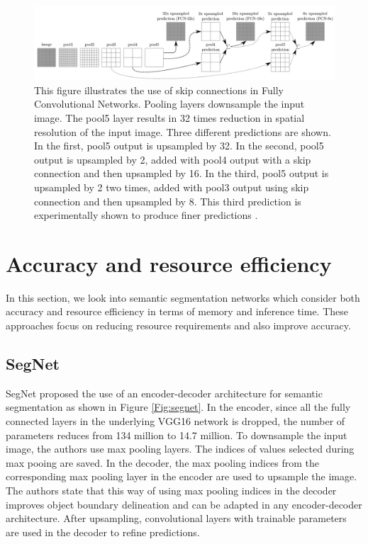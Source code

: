 	\begin{figure}[h]
		\centering
		\includegraphics[width=1\linewidth]{images/fcn_skip}
		\caption{This figure illustrates the use of skip connections in Fully Convolutional Networks. Pooling layers downsample the input image. The pool5 layer results in 32 times reduction in spatial resolution of the input image. Three different predictions are shown. In the first, pool5 output is upsampled by 32. In the second, pool5 output is upsampled by 2, added with pool4 output with a skip connection and then upsampled by 16. In the third, pool5 output is upsampled by 2 two times, added with pool3 output using skip connection and then upsampled by 8. This third prediction is experimentally shown to produce finer predictions \cite{DBLP:journals/corr/LongSD14}.}
		\label{Fig:fcn}
	\end{figure}

\section{Accuracy and resource efficiency}
\label{section:acceff}

In this section, we look into semantic segmentation networks which consider both accuracy and resource efficiency in terms of memory and inference time. These approaches focus on reducing resource requirements and also improve accuracy.

\subsection{SegNet}

SegNet \cite{DBLP:journals/corr/BadrinarayananK15} proposed the use of an encoder-decoder architecture for semantic segmentation as shown in Figure \ref{Fig:segnet}. In the encoder, since all the fully connected layers in the underlying VGG16 network is dropped, the number of parameters reduces from 134 million to 14.7 million. To downsample the input image, the authors use max pooling layers. The indices of values selected during max pooing are saved. In the decoder, the max pooling indices from the corresponding max pooling layer in the encoder are used to upsample the image. The authors state that this way of using max pooling indices in the decoder improves object boundary delineation and can be adapted in any encoder-decoder architecture. After upsampling, convolutional layers with trainable parameters are used in the decoder to refine predictions. 

